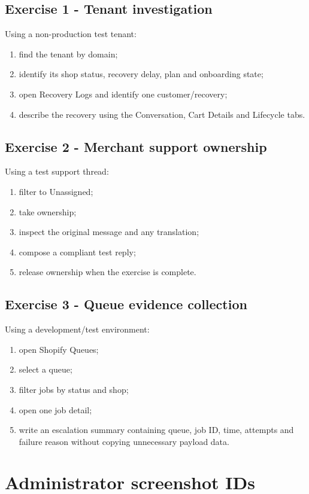 \section{Exercise 1 - Tenant investigation}
Using a non-production test tenant:
\begin{enumerate}
  \item find the tenant by domain;
  \item identify its shop status, recovery delay, plan and onboarding state;
  \item open Recovery Logs and identify one customer/recovery;
  \item describe the recovery using the Conversation, Cart Details and Lifecycle tabs.
\end{enumerate}

\section{Exercise 2 - Merchant support ownership}
Using a test support thread:
\begin{enumerate}
  \item filter to Unassigned;
  \item take ownership;
  \item inspect the original message and any translation;
  \item compose a compliant test reply;
  \item release ownership when the exercise is complete.
\end{enumerate}

\section{Exercise 3 - Queue evidence collection}
Using a development/test environment:
\begin{enumerate}
  \item open Shopify Queues;
  \item select a queue;
  \item filter jobs by status and shop;
  \item open one job detail;
  \item write an escalation summary containing queue, job ID, time, attempts and failure reason without copying unnecessary payload data.
\end{enumerate}

\appendix
\chapter{Administrator screenshot IDs}

